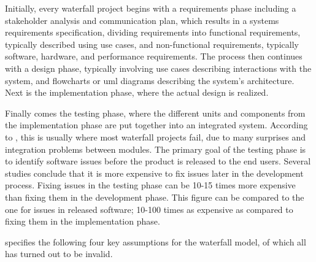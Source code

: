 \documentclass[a4paper,english,12pt]{report}
\begin{document}
Initially, every waterfall project begins with a requirements phase including a stakeholder analysis and communication plan, which results in a systems requirements specification, dividing requirements into functional requirements, typically described using use cases, and non-functional requirements, typically software, hardware, and performance requirements. The process then continues with a design phase, typically involving use cases describing interactions with the system, and flowcharts or \gls{uml} diagrams describing the system's architecture. Next is the implementation phase, where the actual design is realized. \citep[pp. 17-23]{stober2009agile}

Finally comes the testing phase, where the different units and components from the implementation phase are put together into an integrated system. According to \citet{stober2009agile}, this is usually where most waterfall projects fail, due to many surprises and integration problems between modules. The primary goal of the testing phase is to identify software issues before the product is released to the end users. Several studies conclude that it is more expensive to fix issues later in the development process. Fixing issues in the testing phase can be 10-15 times more expensive than fixing them in the development phase. This figure can be compared to the one for issues in released software; 10-100 times as expensive as compared to fixing them in the implementation phase. \citep[pp. 23-24]{stober2009agile}

\citet[pp. 20-24]{leffingwell2007scaling} specifies the following four key assumptions for the waterfall model, of which all has turned out to be invalid.
\end{document}
